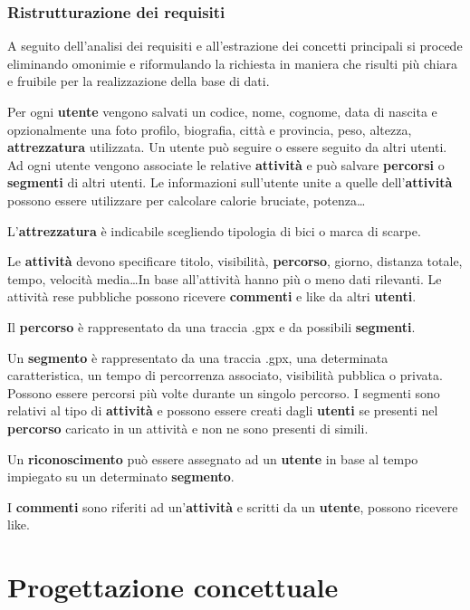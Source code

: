 \documentclass[12pt]{report}
\begin{document}
\subsection*{Ristrutturazione dei requisiti}
A seguito dell'analisi dei requisiti e all'estrazione dei concetti principali si procede eliminando omonimie e
riformulando la richiesta in maniera che risulti più chiara e fruibile per la realizzazione della base di dati.

\vspace{12pt}

Per ogni \textbf{utente} vengono salvati un codice, nome, cognome, data di nascita e opzionalmente una foto profilo,
biografia, città e provincia, peso, altezza, \textbf{attrezzatura} utilizzata. Un utente può seguire o essere seguito 
da altri utenti. Ad ogni utente vengono associate le relative \textbf{attività} e può salvare \textbf{percorsi} o 
\textbf{segmenti} di altri utenti. Le informazioni sull'utente unite a quelle dell'\textbf{attività} possono essere
utilizzare per calcolare calorie bruciate, potenza\dots

L'\textbf{attrezzatura} è indicabile scegliendo tipologia di bici o marca di scarpe.

Le \textbf{attività} devono specificare titolo, visibilità, \textbf{percorso}, giorno, distanza totale,
tempo, velocità media\dots In base all'attività hanno più o meno dati rilevanti. Le attività rese pubbliche 
possono ricevere \textbf{commenti} e like da altri \textbf{utenti}.

Il \textbf{percorso} è rappresentato da una traccia .gpx e da possibili \textbf{segmenti}.

Un \textbf{segmento} è rappresentato da una traccia .gpx, una determinata caratteristica, un tempo di
percorrenza associato, visibilità pubblica o privata. Possono essere percorsi più volte durante un singolo
percorso. I segmenti sono relativi al tipo di \textbf{attività} e possono 
essere creati dagli \textbf{utenti} se presenti nel \textbf{percorso} caricato in un attività e non ne sono presenti 
di simili.

Un \textbf{riconoscimento} può essere assegnato ad un \textbf{utente} in base al tempo impiegato su un determinato 
\textbf{segmento}.

I \textbf{commenti} sono riferiti ad un'\textbf{attività} e scritti da un \textbf{utente}, possono ricevere like.

\chapter{Progettazione concettuale}
\end{document}
